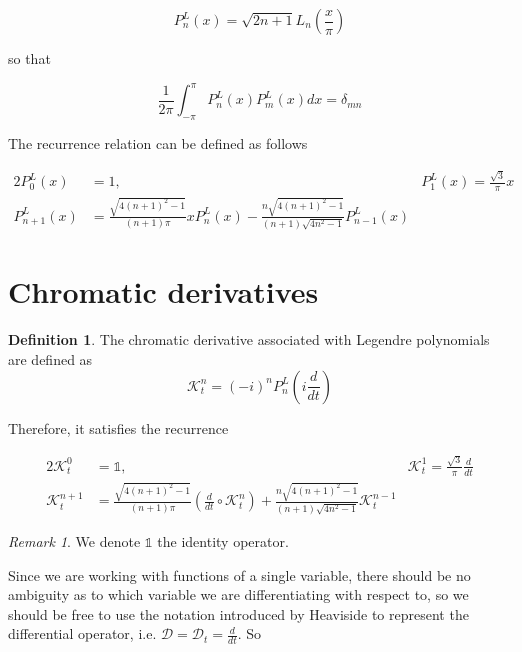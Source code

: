\documentclass[11pt]{article}
\theoremstyle{plain}
\theoremstyle{definition}
\newtheorem{definition}{Definition}[section]
\theoremstyle{remark}
\newtheorem*{remark}{Remark}
\begin{document}
\begin{equation*}
	P_n^L(x) = \sqrt{2n+1}L_n\left(\frac{x}{\pi}\right)
\end{equation*}

so that 

\begin{equation*}
\frac{1}{2\pi} \int_{-\pi}^{\pi} P_n^L(x)P_m^L(x) dx = \delta_{mn}
\end{equation*}

The recurrence relation can be defined as follows

\begin{alignat*}{2}
P_0^L(x) 		&= 1, & P_1^L(x) = \frac{\sqrt{3}}{\pi} x \\
P_{n+1}^L(x) &= \frac{\sqrt{4(n+1)^2-1}}{(n+1) \pi} x P_n^L(x) - \frac{n\sqrt{4(n+1)^2-1}}{(n+1)\sqrt{4n^2-1}} P_{n-1}^L(x)
\end{alignat*}

\section{Chromatic derivatives}

\begin{definition}
The chromatic derivative associated with Legendre polynomials are defined as
\begin{equation}
	\mathcal{K}_t^n = (-i)^n P_n^L \left (i \frac{d}{dt} \right )
\end{equation}
\end{definition}

Therefore, it satisfies the recurrence

\begin{alignat*}{2}
\mathcal{K}_t^0 		&= \mathds{1}, & \mathcal{K}_t^1 = \frac{\sqrt{3}}{\pi} \frac{d}{dt} \\
\mathcal{K}_t^{n+1} &= \frac{\sqrt{4(n+1)^2-1}}{(n+1) \pi} \left ( \frac{d}{dt} \circ \mathcal{K}_t^n \right ) 
											+ \frac{n\sqrt{4(n+1)^2-1}}{(n+1)\sqrt{4n^2-1}} \mathcal{K}_t^{n-1}
\end{alignat*}

\begin{remark}
We denote $\mathds{1}$ the identity operator.
\end{remark}

Since we are working with functions of a single variable, there should be no ambiguity as to
which variable we are differentiating with respect to, so we should be free to use the notation 
introduced by Heaviside to represent the differential operator, i.e. $\mathcal{D} = \mathcal{D}_t = \frac{d}{dt}$. 
So
\end{document}
